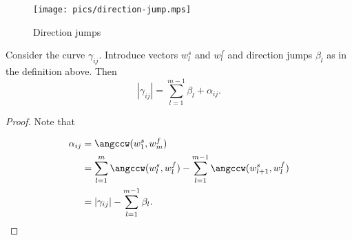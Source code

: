 \begin{figure}[h!]
    \centering
    \texttt{[image: pics/direction-jump.mps]}
    \caption{Direction jumps}
    \label{fig:direction-jumps}
\end{figure}

\begin{observation}
Consider the curve $\gamma_{ij}$.
Introduce vectors $w_{l}^s$ and $w_{l}^f$ and direction jumps $\beta_l$ as in the definition above. Then 
$$|\gamma_{ij}| = \sum_{l=1}^{m-1}\beta_l + \alpha_{ij}.$$
\end{observation}

\begin{proof}
Note that

\begin{align}
\alpha_{ij} & = \angccw(w_{1}^s, w_{m}^f) \\
& = \sum_{l=1}^{m}\angccw(w_{l}^s, w_{l}^f) - \sum_{l=1}^{m-1}\angccw(w_{l+1}^s, w_{l}^f) \\
& = |\gamma_{ij}| - \sum_{l=1}^{m-1}\beta_l. \\
\end{align}




\end{proof}



